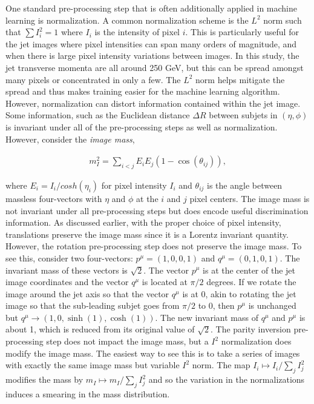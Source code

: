 One standard pre-processing step that is often additionally applied in machine learning is normalization.  A common normalization scheme is the $L^2$ norm such that $\sum I_i^2=1$ where $I_i$ is the intensity of pixel $i$.  This is particularly useful for the jet images where pixel intensities can span many orders of magnitude, and when there is large pixel intensity variations between images.  In this study, the jet transverse momenta are all around 250 GeV, but this can be spread amongst many pixels or concentrated in only a few. The $L^2$ norm helps mitigate the spread and thus makes training easier for the machine learning algorithm.  However, normalization can distort information contained within the jet image.  Some information, such as the Euclidean distance $\Delta R$ between subjets in $(\eta,\phi)$ is invariant under all of the pre-processing steps as well as normalization.  However, consider the {\it image mass}, 

\begin{align}
m_I^2=\sum_{i<j} E_iE_j(1-\cos(\theta_{ij})),
\end{align}

\noindent where $E_i=I_i/cosh(\eta_i)$ for pixel intensity $I_i$ and $\theta_{ij}$ is the angle between massless four-vectors with $\eta$ and $\phi$ at the $i$ and $j$ pixel centers.  The image mass is not invariant under all pre-processing steps but does encode useful discrimination information.  As discussed earlier, with the proper choice of pixel intensity, translations preserve the image mass since it is a Lorentz invariant quantity.  However, the rotation pre-processing step does not preserve the image mass.  To see this, consider two four-vectors: $p^\mu=(1,0,0,1)$ and $q^\mu=(0,1,0,1)$.   The invariant mass of these vectors is $\sqrt{2}$.  The vector $p^\mu$ is at the center of the jet image coordinates and the vector $q^\mu$ is located at $\pi/2$ degrees.  If we rotate the image around the jet axis so that the vector $q^\mu$ is at $0$, akin to rotating the jet image so that the sub-leading subjet goes from $\pi/2$ to $0$, then $p^\mu$ is unchanged but $q^\mu\rightarrow (1,0,\sinh(1),\cosh(1))$.  The new invariant mass of $q^\mu$ and $p^\mu$ is about 1, which is reduced from its original value of $\sqrt{2}$.  The parity inversion pre-processing step does not impact the image mass, but a $I^2$ normalization does modify the image mass.  The easiest way to see this is to take a series of images with exactly the same image mass but variable $I^2$ norm.  The map $I_i\mapsto I_i/\sum_j I_j^2$ modifies the mass by $m_I\mapsto m_I/\sum_j I_j^2$ and so the variation in the normalizations induces a smearing in the mass distribution.

